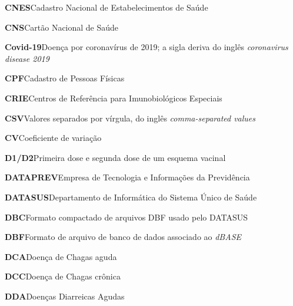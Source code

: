 \noindent\textbf{CNES}\hspace{1em}Cadastro Nacional de Estabelecimentos de Saúde\par\smallskip
\noindent\textbf{CNS}\hspace{1em}Cartão Nacional de Saúde\par\smallskip
\noindent\textbf{Covid-19}\hspace{1em}Doença por coronavírus de 2019; a sigla deriva do inglês \emph{coronavirus disease 2019}\par\smallskip
\noindent\textbf{CPF}\hspace{1em}Cadastro de Pessoas Físicas\par\smallskip
\noindent\textbf{CRIE}\hspace{1em}Centros de Referência para Imunobiológicos Especiais\par\smallskip
\noindent\textbf{CSV}\hspace{1em}Valores separados por vírgula, do inglês \emph{comma-separated values}\par\smallskip
\noindent\textbf{CV}\hspace{1em}Coeficiente de variação\par\smallskip
\noindent\textbf{D1/D2}\hspace{1em}Primeira dose e segunda dose de um esquema vacinal\par\smallskip
\noindent\textbf{DATAPREV}\hspace{1em}Empresa de Tecnologia e Informações da Previdência\par\smallskip
\noindent\textbf{DATASUS}\hspace{1em}Departamento de Informática do Sistema Único de Saúde\par\smallskip
\noindent\textbf{DBC}\hspace{1em}Formato compactado de arquivos DBF usado pelo DATASUS\par\smallskip
\noindent\textbf{DBF}\hspace{1em}Formato de arquivo de banco de dados associado ao \emph{dBASE}\par\smallskip
\noindent\textbf{DCA}\hspace{1em}Doença de Chagas aguda\par\smallskip
\noindent\textbf{DCC}\hspace{1em}Doença de Chagas crônica\par\smallskip
\noindent\textbf{DDA}\hspace{1em}Doenças Diarreicas Agudas\par\smallskip
